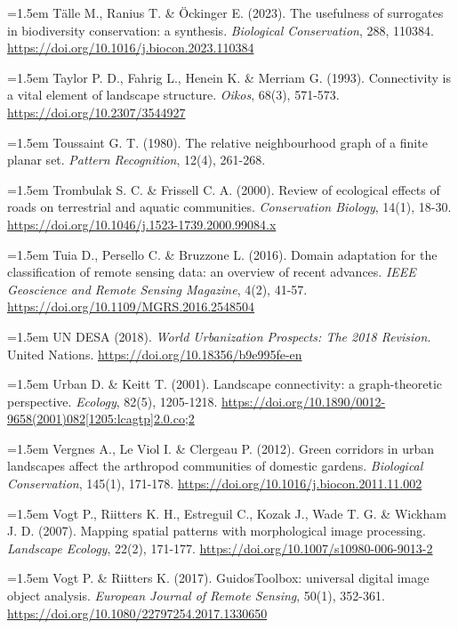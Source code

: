 \documentclass[a4paper,12pt]{report}
\begin{document}
\noindent\hangindent=1.5em Tälle M., Ranius T. \& Öckinger E. (2023). The usefulness of surrogates in biodiversity conservation: a synthesis. \textit{Biological Conservation}, 288, 110384. \url{https://doi.org/10.1016/j.biocon.2023.110384}\par\medskip
\noindent\hangindent=1.5em Taylor P. D., Fahrig L., Henein K. \& Merriam G. (1993). Connectivity is a vital element of landscape structure. \textit{Oikos}, 68(3), 571-573. \url{https://doi.org/10.2307/3544927}\par\medskip
\noindent\hangindent=1.5em Toussaint G. T. (1980). The relative neighbourhood graph of a finite planar set. \textit{Pattern Recognition}, 12(4), 261-268.\par\medskip
\noindent\hangindent=1.5em Trombulak S. C. \& Frissell C. A. (2000). Review of ecological effects of roads on terrestrial and aquatic communities. \textit{Conservation Biology}, 14(1), 18-30. \url{https://doi.org/10.1046/j.1523-1739.2000.99084.x}\par\medskip
\noindent\hangindent=1.5em Tuia D., Persello C. \& Bruzzone L. (2016). Domain adaptation for the classification of remote sensing data: an overview of recent advances. \textit{IEEE Geoscience and Remote Sensing Magazine}, 4(2), 41-57. \url{https://doi.org/10.1109/MGRS.2016.2548504}\par\medskip
\noindent\hangindent=1.5em UN DESA (2018). \textit{World Urbanization Prospects: The 2018 Revision}. United Nations. \url{https://doi.org/10.18356/b9e995fe-en}\par\medskip
\noindent\hangindent=1.5em Urban D. \& Keitt T. (2001). Landscape connectivity: a graph-theoretic perspective. \textit{Ecology}, 82(5), 1205-1218. \url{https://doi.org/10.1890/0012-9658(2001)082[1205:lcagtp]2.0.co;2}\par\medskip
\noindent\hangindent=1.5em Vergnes A., Le Viol I. \& Clergeau P. (2012). Green corridors in urban landscapes affect the arthropod communities of domestic gardens. \textit{Biological Conservation}, 145(1), 171-178. \url{https://doi.org/10.1016/j.biocon.2011.11.002}\par\medskip
\noindent\hangindent=1.5em Vogt P., Riitters K. H., Estreguil C., Kozak J., Wade T. G. \& Wickham J. D. (2007). Mapping spatial patterns with morphological image processing. \textit{Landscape Ecology}, 22(2), 171-177. \url{https://doi.org/10.1007/s10980-006-9013-2}\par\medskip
\noindent\hangindent=1.5em Vogt P. \& Riitters K. (2017). GuidosToolbox: universal digital image object analysis. \textit{European Journal of Remote Sensing}, 50(1), 352-361. \url{https://doi.org/10.1080/22797254.2017.1330650}\par\medskip
\end{document}
